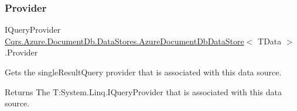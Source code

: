 \subsubsection{\texorpdfstring{Provider}{Provider}}
{\footnotesize\ttfamily I\+Query\+Provider \hyperlink{classCqrs_1_1Azure_1_1DocumentDb_1_1DataStores_1_1AzureDocumentDbDataStore}{Cqrs.\+Azure.\+Document\+Db.\+Data\+Stores.\+Azure\+Document\+Db\+Data\+Store}$<$ T\+Data $>$.Provider\hspace{0.3cm}{\ttfamily [get]}}



Gets the single\+Result\+Query provider that is associated with this data source. 

\begin{DoxyReturn}{Returns}
The T\+:\+System.\+Linq.\+I\+Query\+Provider that is associated with this data source. 
\end{DoxyReturn}
